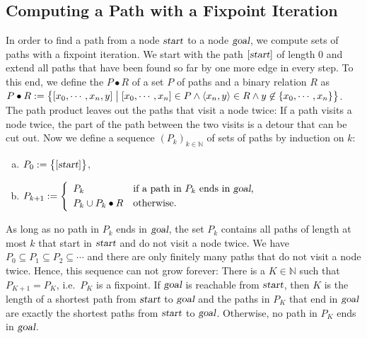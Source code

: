 \subsection{Computing a Path with a Fixpoint Iteration}
In order to find a path from a node $\textsl{start}$ to a node $\textsl{goal}$, we compute sets of paths with a
fixpoint iteration.  We start with the path $[\textsl{start}]$ of length $0$ and extend all paths that have been
found so far by one more edge in every step.  To this end, we define the 
$P \bullet R$ of a set $P$ of paths and a binary relation $R$ as
\\[0.2cm]
\hspace*{1.3cm}
$P \bullet R := \bigl\{ [x_0, \cdots, x_n, y] \bigm| [x_0, \cdots, x_n] \in P \wedge \pair(x_n, y) \in R \wedge
 y \not\in \{ x_0, \cdots, x_n \} \bigr\}$.
\\[0.2cm]
The path product leaves out the paths that visit a node twice:  If a path visits a node twice, the part of the path
between the two visits is a detour that can be cut out.  Now we define a sequence $(P_k)_{k \in \mathbb{N}}$ of sets
of paths by induction on $k$:
\begin{enumerate}[(a)]
\item $P_0 := \bigl\{ [\textsl{start}] \bigr\}$,
\item $P_{k+1} := \left\{
       \begin{array}{ll}
         P_k                     & \mbox{if a path in $P_k$ ends in $\textsl{goal}$,} \\[0.1cm]
         P_k \cup P_k \bullet R  & \mbox{otherwise.}
       \end{array}\right.$
\end{enumerate}
As long as no path in $P_k$ ends in $\textsl{goal}$, the set $P_k$ contains all paths of length at most $k$ that
start in $\textsl{start}$ and do not visit a node twice.  We have $P_0 \subseteq P_1 \subseteq P_2 \subseteq \cdots$
and there are only finitely many paths that do not visit a node twice.  Hence, this sequence can not grow forever:
There is a $K \in \mathbb{N}$ such that $P_{K+1} = P_K$, i.e.~$P_K$ is a fixpoint.  If $\textsl{goal}$ is reachable
from $\textsl{start}$, then $K$ is the length of a shortest path from $\textsl{start}$ to $\textsl{goal}$ and the
paths in $P_K$ that end in $\textsl{goal}$ are exactly the shortest paths from $\textsl{start}$ to $\textsl{goal}$.
Otherwise, no path in $P_K$ ends in $\textsl{goal}$.

